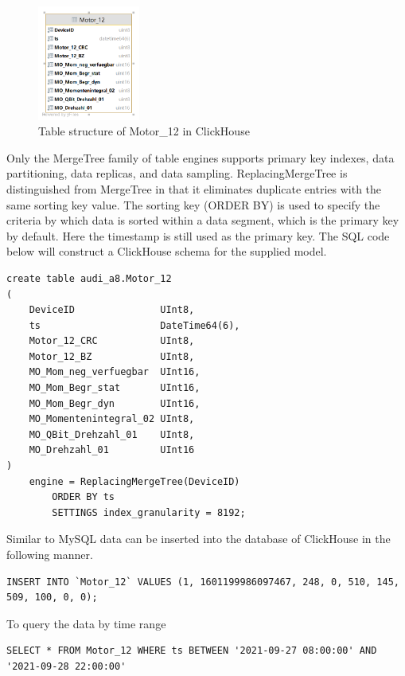 \begin{figure}[hbt!]
    \centering
    \includegraphics[width=0.3\textwidth]{gfx/Motor_12_ch.png}
    \caption{Table structure of Motor\_12 in ClickHouse}
    \label{fig:ch_model}
\end{figure}

Only the MergeTree family of table engines supports primary key indexes, data partitioning, data replicas, and data sampling. ReplacingMergeTree is distinguished from MergeTree in that it eliminates duplicate entries with the same sorting key value\cite{mergetree_clickhouse}. The sorting key (ORDER BY) is used to specify the criteria by which data is sorted within a data segment, which is the primary key by default. Here the timestamp is still used as the primary key. The SQL code below will construct a ClickHouse schema for the supplied model.

\begin{verbatim}
create table audi_a8.Motor_12
(
    DeviceID               UInt8,
    ts                     DateTime64(6),
    Motor_12_CRC           UInt8,
    Motor_12_BZ            UInt8,
    MO_Mom_neg_verfuegbar  UInt16,
    MO_Mom_Begr_stat       UInt16,
    MO_Mom_Begr_dyn        UInt16,
    MO_Momentenintegral_02 UInt8,
    MO_QBit_Drehzahl_01    UInt8,
    MO_Drehzahl_01         UInt16
)
    engine = ReplacingMergeTree(DeviceID)
        ORDER BY ts
        SETTINGS index_granularity = 8192;
\end{verbatim}

Similar to MySQL data can be inserted into the database of ClickHouse in the following manner.
\begin{verbatim}
INSERT INTO `Motor_12` VALUES (1, 1601199986097467, 248, 0, 510, 145, 509, 100, 0, 0);
\end{verbatim}

To query the data by time range
\begin{verbatim}
SELECT * FROM Motor_12 WHERE ts BETWEEN '2021-09-27 08:00:00' AND '2021-09-28 22:00:00'
\end{verbatim}

